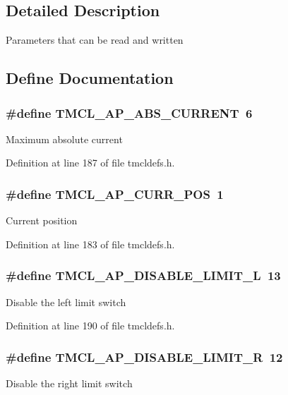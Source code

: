 \subsection{Detailed Description}
Parameters that can be read and written 

\subsection{Define Documentation}
\hypertarget{group__RWParam_gaaf8d5010f2cf9799b5321358b5f5fb35}{
\subsubsection[{TMCL\_\-AP\_\-ABS\_\-CURRENT}]{\setlength{\rightskip}{0pt plus 5cm}\#define TMCL\_\-AP\_\-ABS\_\-CURRENT~6}}
\label{group__RWParam_gaaf8d5010f2cf9799b5321358b5f5fb35}
Maximum absolute current 

Definition at line 187 of file tmcldefs.h.\hypertarget{group__RWParam_ga46ffdf772b16b88c99f5b48893b3f710}{
\subsubsection[{TMCL\_\-AP\_\-CURR\_\-POS}]{\setlength{\rightskip}{0pt plus 5cm}\#define TMCL\_\-AP\_\-CURR\_\-POS~1}}
\label{group__RWParam_ga46ffdf772b16b88c99f5b48893b3f710}
Current position 

Definition at line 183 of file tmcldefs.h.\hypertarget{group__RWParam_ga36067071d35368d2a1b03ddfae1d4eb9}{
\subsubsection[{TMCL\_\-AP\_\-DISABLE\_\-LIMIT\_\-L}]{\setlength{\rightskip}{0pt plus 5cm}\#define TMCL\_\-AP\_\-DISABLE\_\-LIMIT\_\-L~13}}
\label{group__RWParam_ga36067071d35368d2a1b03ddfae1d4eb9}
Disable the left limit switch 

Definition at line 190 of file tmcldefs.h.\hypertarget{group__RWParam_ga126f3a0bebd82760451aeadab91d6e06}{
\subsubsection[{TMCL\_\-AP\_\-DISABLE\_\-LIMIT\_\-R}]{\setlength{\rightskip}{0pt plus 5cm}\#define TMCL\_\-AP\_\-DISABLE\_\-LIMIT\_\-R~12}}
\label{group__RWParam_ga126f3a0bebd82760451aeadab91d6e06}
Disable the right limit switch 

